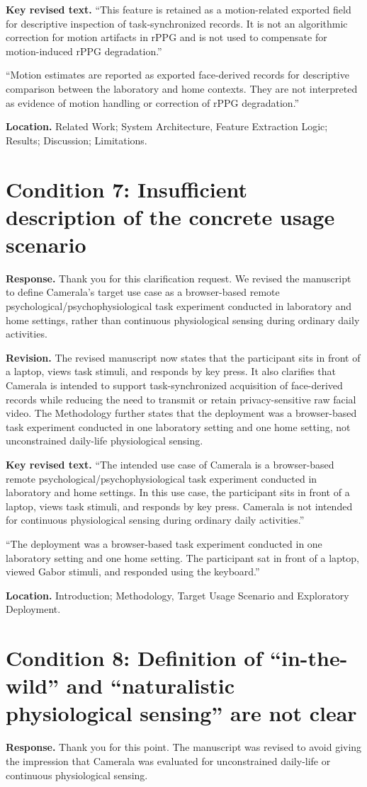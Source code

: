 \documentclass[11pt]{article}
\newcommand{\condition}[2]{\section*{Condition #1: #2}}
\begin{document}
\textbf{Key revised text.}
``This feature is retained as a motion-related exported field for descriptive inspection of task-synchronized records. It is not an algorithmic correction for motion artifacts in rPPG and is not used to compensate for motion-induced rPPG degradation.''

``Motion estimates are reported as exported face-derived records for descriptive comparison between the laboratory and home contexts. They are not interpreted as evidence of motion handling or correction of rPPG degradation.''

\textbf{Location.}
Related Work; System Architecture, Feature Extraction Logic; Results; Discussion; Limitations.

\condition{7}{Insufficient description of the concrete usage scenario}
\textbf{Response.}
Thank you for this clarification request.
We revised the manuscript to define Camerala's target use case as a browser-based remote psychological/psychophysiological task experiment conducted in laboratory and home settings, rather than continuous physiological sensing during ordinary daily activities.

\textbf{Revision.}
The revised manuscript now states that the participant sits in front of a laptop, views task stimuli, and responds by key press.
It also clarifies that Camerala is intended to support task-synchronized acquisition of face-derived records while reducing the need to transmit or retain privacy-sensitive raw facial video.
The Methodology further states that the deployment was a browser-based task experiment conducted in one laboratory setting and one home setting, not unconstrained daily-life physiological sensing.

\textbf{Key revised text.}
``The intended use case of Camerala is a browser-based remote psychological/psychophysiological task experiment conducted in laboratory and home settings. In this use case, the participant sits in front of a laptop, views task stimuli, and responds by key press. Camerala is not intended for continuous physiological sensing during ordinary daily activities.''

``The deployment was a browser-based task experiment conducted in one laboratory setting and one home setting. The participant sat in front of a laptop, viewed Gabor stimuli, and responded using the keyboard.''

\textbf{Location.}
Introduction; Methodology, Target Usage Scenario and Exploratory Deployment.

\condition{8}{Definition of ``in-the-wild'' and ``naturalistic physiological sensing'' are not clear}
\textbf{Response.}
Thank you for this point.
The manuscript was revised to avoid giving the impression that Camerala was evaluated for unconstrained daily-life or continuous physiological sensing.
\end{document}

